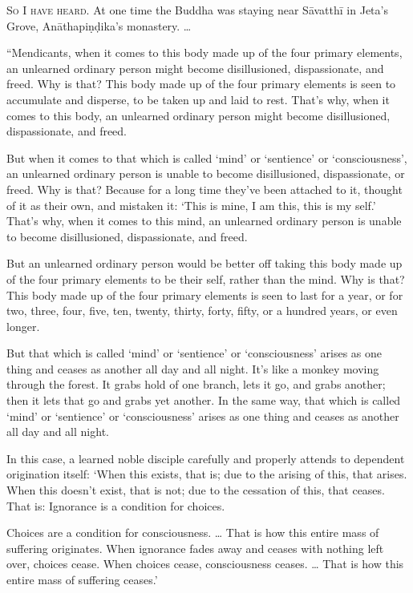 \documentclass[12pt,openany]{book}%
\newcommand*{\scevam}[1]{\textsc{#1}}
\begin{document}
\scevam{So I have heard. }At one time the Buddha was staying near \textsanskrit{Sāvatthī} in Jeta’s Grove, \textsanskrit{Anāthapiṇḍika}’s monastery. … 

“Mendicants, when it comes to this body made up of the four primary elements, an unlearned ordinary person might become disillusioned, dispassionate, and freed. Why is that? This body made up of the four primary elements is seen to accumulate and disperse, to be taken up and laid to rest. That’s why, when it comes to this body, an unlearned ordinary person might become disillusioned, dispassionate, and freed. 

But when it comes to that which is called ‘mind’ or ‘sentience’ or ‘consciousness’, an unlearned ordinary person is unable to become disillusioned, dispassionate, or freed. Why is that? Because for a long time they’ve been attached to it, thought of it as their own, and mistaken it: ‘This is mine, I am this, this is my self.’ That’s why, when it comes to this mind, an unlearned ordinary person is unable to become disillusioned, dispassionate, and freed. 

But an unlearned ordinary person would be better off taking this body made up of the four primary elements to be their self, rather than the mind. Why is that? This body made up of the four primary elements is seen to last for a year, or for two, three, four, five, ten, twenty, thirty, forty, fifty, or a hundred years, or even longer. 

But that which is called ‘mind’ or ‘sentience’ or ‘consciousness’ arises as one thing and ceases as another all day and all night. It’s like a monkey moving through the forest. It grabs hold of one branch, lets it go, and grabs another; then it lets that go and grabs yet another. In the same way, that which is called ‘mind’ or ‘sentience’ or ‘consciousness’ arises as one thing and ceases as another all day and all night. 

In this case, a learned noble disciple carefully and properly attends to dependent origination itself: ‘When this exists, that is; due to the arising of this, that arises. When this doesn’t exist, that is not; due to the cessation of this, that ceases. That is: Ignorance is a condition for choices. 

Choices are a condition for consciousness. … That is how this entire mass of suffering originates. When ignorance fades away and ceases with nothing left over, choices cease. When choices cease, consciousness ceases. … That is how this entire mass of suffering ceases.’ 
\end{document}
